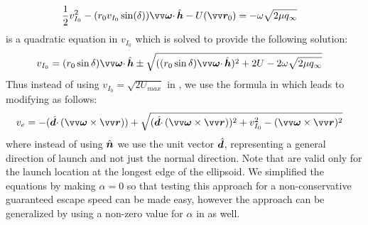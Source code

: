 \begin{align}
    \frac{1}{2} v_{I_0}^2 - (r_0 v_{I_0} \sin(\delta)) \bv{\omega}\cdotp\buv{h} - U(\bv{r}_0) &= -\omega \sqrt{2\mu q_{\infty}}
    \label{eqn:jacobian_equate_equatorial_mod}
\end{align}
 is a quadratic equation in $v_{I_0}$ which is solved to provide the following solution:
\begin{align}
    v_{I_0} &= (r_0 \sin\delta) \bv{\omega}\cdotp\buv{h} \pm \sqrt{((r_0 \sin\delta)\bv{\omega}\cdotp\buv{h})^2 + 2U - 2\omega\sqrt{2\mu q_\infty}}
    \label{eqn:non_conservative_inertial_guaranteed_escape_speed}
\end{align}
Thus instead of using $v_{I_0} = \sqrt{2U_{max}}$ in , we use the formula in  which leads to modifying  as follows:
\begin{align}
    v_e &= -(\buv{d} \cdotp (\bv{\omega} \times \bv{r})) + \sqrt{(\buv{d} \cdotp (\bv{\omega} \times \bv{r}))^2 + v_{I_0}^2 - (\bv{\omega} \times {\bv{r}})^2}
    \label{eqn:nonconservative_escape_speed}
\end{align}
where instead of using $\hat{\bm{n}}$ we use the unit vector $\hat{\bm{d}}$, representing a general direction of launch and not just the normal direction. Note that  are valid only for the launch location at the longest edge of the ellipsoid. We simplified the equations by making $\alpha=0$ so that testing this approach for a non-conservative guaranteed escape speed can be made easy, however the approach can be generalized by using a non-zero value for $\alpha$ in  as well.

